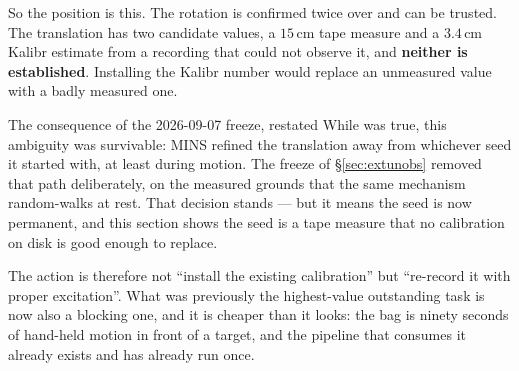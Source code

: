 So the position is this. The rotation is confirmed twice over and can be
trusted. The translation has two candidate values, a $15$\,cm tape measure
and a $3.4$\,cm Kalibr estimate from a recording that could not observe it,
and \textbf{neither is established}. Installing the Kalibr number would
replace an unmeasured value with a badly measured one.

\begin{trapbox}{The consequence of the 2026-09-07 freeze, restated}
While  was true, this ambiguity was survivable: MINS
refined the translation away from whichever seed it started with, at least
during motion. The freeze of \S\ref{sec:extunobs} removed that path
deliberately, on the measured grounds that the same mechanism random-walks
at rest. That decision stands --- but it means the seed is now permanent,
and this section shows the seed is a tape measure that no calibration on
disk is good enough to replace.

The action is therefore not ``install the existing calibration'' but
``re-record it with proper excitation''. What was previously the
highest-value outstanding task is now also a blocking one, and it is
cheaper than it looks: the bag is ninety seconds of hand-held motion in
front of a target, and the pipeline that consumes it already exists and has
already run once.
\end{trapbox}

